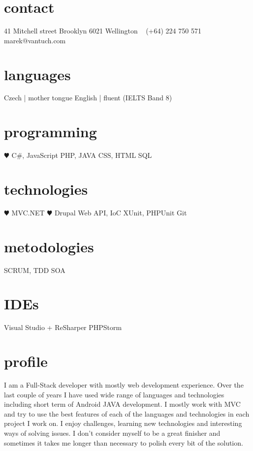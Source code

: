 \documentclass[]{friggeri-cv} %
\begin{document}


\begin{aside} %
\section{contact}
41 Mitchell street
Brooklyn
6021 Wellington
~
(+64) 224 750 571
~
marek@vantuch.com
\section{languages}
Czech | mother tongue
English | fluent
(IELTS Band 8)
\section{programming}
{\color{red} $\varheartsuit$} C\#, JavaScript
PHP, JAVA
CSS, HTML
SQL
\section{technologies}
{\color{red} $\varheartsuit$} MVC.NET {\color{red} $\varheartsuit$} Drupal
Web API, IoC
XUnit, PHPUnit
Git
\section{metodologies}
SCRUM, TDD
SOA
\section{IDEs}
Visual Studio + ReSharper
PHPStorm
\end{aside}

\section{profile}
I am a Full-Stack developer with mostly web development experience.
Over the last couple of years I have used wide range of languages and technologies including short term of Android JAVA development.
I mostly work with MVC and try to use the best features of each of the languages and technologies in each project I work on.
I enjoy challenges, learning new technologies and interesting ways of solving issues.
I don't consider myself to be a great finisher and sometimes it takes me longer than necessary to polish every bit of the solution.
\end{document}
